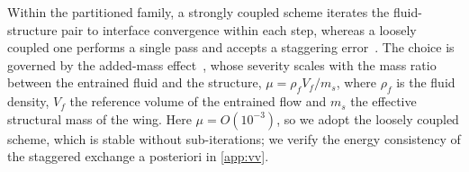 %

Within the partitioned family, a strongly coupled scheme iterates the fluid-structure pair to interface convergence within each step, whereas a loosely coupled one performs a single pass and accepts a staggering error~\cite{piperno1995,degroote2013partitioned}. The choice is governed by the added-mass effect~\cite{causin2005addedmass,forster2007added}, whose severity scales with the mass ratio between the entrained fluid and the structure, $\mu = \rho_f V_f / m_s$, where $\rho_f$ is the fluid density, $V_f$ the reference volume of the entrained flow and $m_s$ the effective structural mass of the wing. Here $\mu = O(10^{-3})$, so we adopt the loosely coupled scheme, which is stable without sub-iterations; we verify the energy consistency of the staggered exchange a posteriori in \cref{app:vv}.

